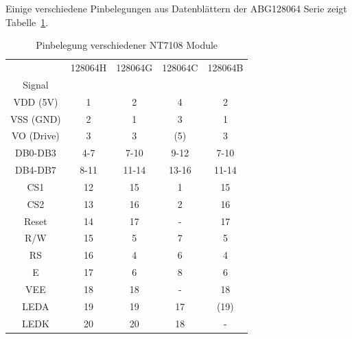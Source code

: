 Einige verschiedene Pinbelegungen aus Datenblättern der ABG128064 Serie zeigt Tabelle~\ref{tab:NT7108types}.

\begin{table}[H]
  \begin{center}
    \begin{tabular}{| c || c | c | c | c |}
    \hline
           & 128064H  &  128064G  & 128064C  & 128064B \\
    Signal &         &          &         &         \\
    \hline
    \hline
  VDD (5V) &   1     &  2       &   4     & 2       \\
    \hline
  VSS (GND) &   2     &  1       &   3     & 1       \\
    \hline
 VO (Drive) &   3     &  3       &  (5)    & 3       \\
    \hline
  DB0-DB3   &   4-7   &  7-10    &   9-12  & 7-10    \\
    \hline
  DB4-DB7   &   8-11  &  11-14   &   13-16 & 11-14   \\
    \hline
  CS1       &   12    &  15      &   1     & 15      \\
  CS2       &   13    &  16      &   2     & 16      \\
    \hline
  Reset     &   14    &  17      &   -     & 17      \\
    \hline
  R/W       &   15    &  5       &   7     & 5       \\
    \hline
  RS        &   16    &  4       &   6     & 4       \\
    \hline
  E         &   17    &  6       &   8     & 6       \\
    \hline
  VEE       &   18    &  18      &   -     & 18      \\
    \hline
  LEDA      &   19    &  19      &   17    & (19)      \\
  LEDK      &   20    &  20      &   18    & -      \\
    \hline
    \end{tabular}
  \end{center}
  \caption{Pinbelegung verschiedener NT7108 Module}
  \label{tab:NT7108types}
\end{table}


